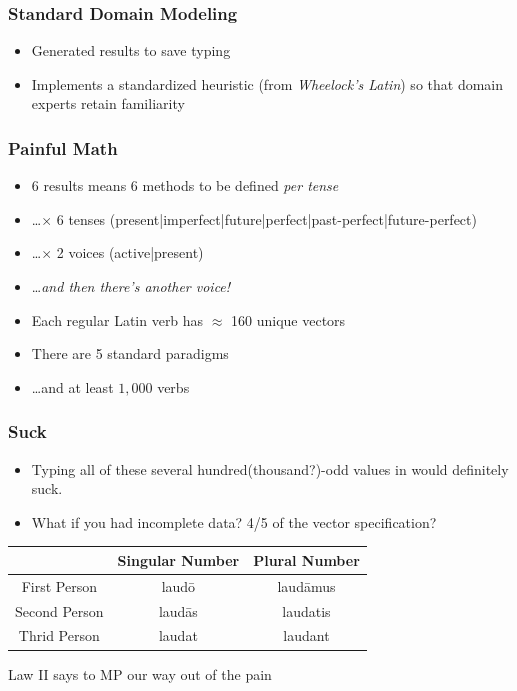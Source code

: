 \documentclass[slidestop,compress,mathserif,notes]{beamer}
\begin{document}
\begin{frame}
	\frametitle{Standard Domain Modeling}
	\begin{itemize}
		\item Generated results to save typing
		\item Implements a standardized heuristic (from \emph{Wheelock's Latin}) so that domain experts retain familiarity
	\end{itemize}
\end{frame}



\begin{frame}
	\frametitle{Painful Math}
	\begin{itemize}
		\item 6 results means 6 methods to be defined \emph{per tense}
		\pause
		\item \ldots $\times$ 6 tenses (present|imperfect|future|perfect|past-perfect|future-perfect)
		\pause
		\item \ldots $\times$ 2 voices (active|present)
		\pause
		\item \ldots \emph{and then there's another voice!}
		\pause
		\item Each regular Latin verb has $\approx$  160 unique vectors
		\pause
		\item There are 5 standard paradigms
		\pause
		\item \ldots and at least $1,000$ verbs
	\end{itemize}
\end{frame}

\begin{frame}
		\frametitle{Suck}
		\begin{itemize}
			\item Typing all of these several hundred(thousand?)-odd values in would definitely suck.
			\pause
			\item What if you had incomplete data?  4/5 of the vector specification?
		\end{itemize}
		\begin{center}
			\begin{tabular}{|c|c|c|}
				\hline
				  & Singular Number &  Plural Number\\
				\hline
				First Person  & laud\={o}  & laud\={a}mus\\
				Second Person & laud\={a}s & laudatis \\
				Thrid Person  & laudat     & laudant \\
				\hline
			\end{tabular}
		\end{center}
		\pause
		Law II says to MP our way out of the pain
\end{frame}
\end{document}
